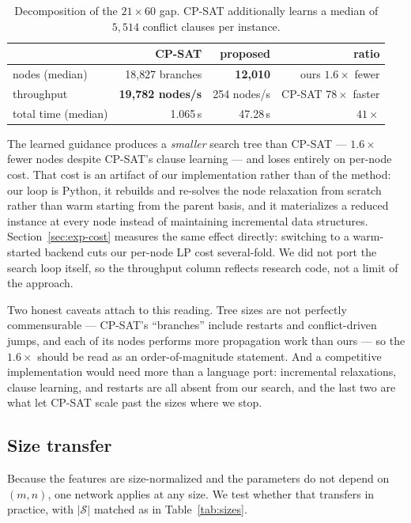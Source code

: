 \documentclass[11pt]{article}
\newcommand{\SOL}{\mathcal{S}}
\begin{document}
\begin{table}[h]
\centering
\begin{tabular}{lrrr}
\toprule
 & CP-SAT & proposed & ratio \\
\midrule
nodes (median) & 18{,}827 branches & \textbf{12{,}010} & ours $1.6\times$ fewer \\
throughput & \textbf{19{,}782 nodes/s} & 254 nodes/s & CP-SAT $78\times$ faster \\
total time (median) & 1.065\,s & 47.28\,s & $41\times$ \\
\bottomrule
\end{tabular}
\caption{Decomposition of the $21\times60$ gap. CP-SAT additionally learns a median of $5{,}514$ conflict clauses per instance.}
\label{tab:decomp}
\end{table}

The learned guidance produces a \emph{smaller} search tree than CP-SAT --- $1.6\times$ fewer nodes despite CP-SAT's clause learning --- and loses entirely on per-node cost. That cost is an artifact of our implementation rather than of the method: our loop is Python, it rebuilds and re-solves the node relaxation from scratch rather than warm starting from the parent basis, and it materializes a reduced instance at every node instead of maintaining incremental data structures. Section~\ref{sec:exp-cost} measures the same effect directly: switching to a warm-started backend cuts our per-node LP cost several-fold. We did not port the search loop itself, so the throughput column reflects research code, not a limit of the approach.

Two honest caveats attach to this reading. Tree sizes are not perfectly commensurable --- CP-SAT's ``branches'' include restarts and conflict-driven jumps, and each of its nodes performs more propagation work than ours --- so the $1.6\times$ should be read as an order-of-magnitude statement. And a competitive implementation would need more than a language port: incremental relaxations, clause learning, and restarts are all absent from our search, and the last two are what let CP-SAT scale past the sizes where we stop.

\subsection{Size transfer}
\label{sec:exp-transfer}

Because the features are size-normalized and the parameters do not depend on $(m,n)$, one network applies at any size. We test whether that transfers in practice, with $|\SOL|$ matched as in Table~\ref{tab:sizes}.
\end{document}
